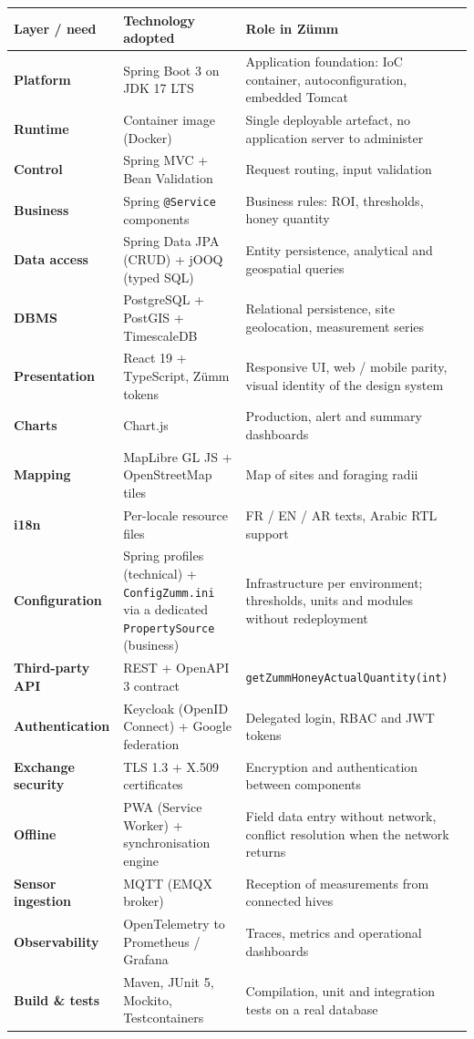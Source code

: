 \begin{xltabular}{\textwidth}{>{\bfseries}p{3.1cm} p{4.9cm} X}
\toprule
\textbf{Layer / need} & \textbf{Technology adopted} & \textbf{Role in Zümm} \\
\midrule
\endhead
Platform          & Spring Boot 3 on JDK 17 LTS       & Application foundation: IoC container, autoconfiguration, embedded Tomcat \\
Runtime           & Container image (Docker)          & Single deployable artefact, no application server to administer \\
Control           & Spring MVC + Bean Validation      & Request routing, input validation \\
Business          & Spring \texttt{@Service} components & Business rules: ROI, thresholds, honey quantity \\
Data access       & Spring Data JPA (CRUD) + jOOQ (typed SQL) & Entity persistence, analytical and geospatial queries \\
DBMS              & PostgreSQL + PostGIS + TimescaleDB & Relational persistence, site geolocation, measurement series \\
Presentation      & React 19 + TypeScript, Zümm tokens & Responsive UI, web / mobile parity, visual identity of the design system \\
Charts            & Chart.js                          & Production, alert and summary dashboards \\
Mapping           & MapLibre GL JS + OpenStreetMap tiles & Map of sites and foraging radii \\
i18n              & Per-locale resource files         & FR / EN / AR texts, Arabic RTL support \\
Configuration     & Spring profiles (technical) + \texttt{ConfigZumm.ini} via a dedicated \texttt{PropertySource} (business) & Infrastructure per environment; thresholds, units and modules without redeployment \\
Third-party API   & REST + OpenAPI 3 contract         & \texttt{getZummHoneyActualQuantity(int)} \\
Authentication    & Keycloak (OpenID Connect) + Google federation & Delegated login, RBAC and JWT tokens \\
Exchange security & TLS 1.3 + X.509 certificates      & Encryption and authentication between components \\
Offline           & PWA (Service Worker) + synchronisation engine & Field data entry without network, conflict resolution when the network returns \\
Sensor ingestion  & MQTT (EMQX broker)                & Reception of measurements from connected hives \\
Observability     & OpenTelemetry to Prometheus / Grafana & Traces, metrics and operational dashboards \\
Build \& tests    & Maven, JUnit 5, Mockito, Testcontainers & Compilation, unit and integration tests on a real database \\
\bottomrule
\end{xltabular}


